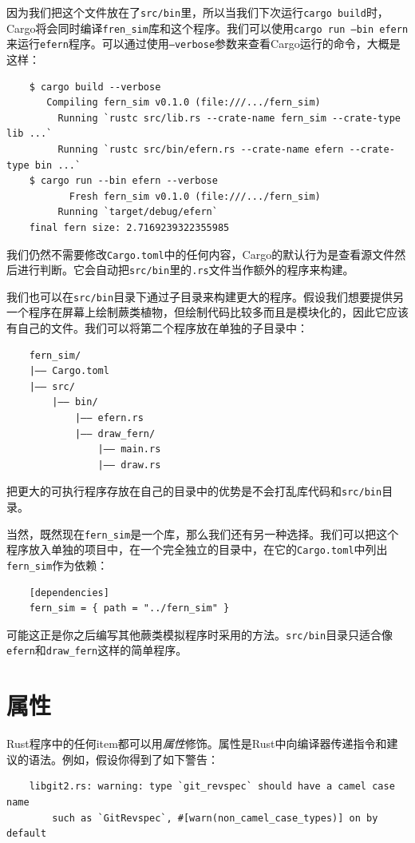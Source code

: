 因为我们把这个文件放在了\texttt{src/bin}里，所以当我们下次运行\texttt{cargo build}时，Cargo将会同时编译\texttt{fren\_sim}库和这个程序。我们可以使用\texttt{cargo run --bin efern}来运行\texttt{efern}程序。可以通过使用\texttt{--verbose}参数来查看Cargo运行的命令，大概是这样：
\begin{verbatim}
    $ cargo build --verbose
       Compiling fern_sim v0.1.0 (file:///.../fern_sim)
         Running `rustc src/lib.rs --crate-name fern_sim --crate-type lib ...`
         Running `rustc src/bin/efern.rs --crate-name efern --crate-type bin ...`
    $ cargo run --bin efern --verbose
           Fresh fern_sim v0.1.0 (file:///.../fern_sim)
         Running `target/debug/efern`
    final fern size: 2.7169239322355985
\end{verbatim}

我们仍然不需要修改\texttt{Cargo.toml}中的任何内容，Cargo的默认行为是查看源文件然后进行判断。它会自动把\texttt{src/bin}里的\texttt{.rs}文件当作额外的程序来构建。

我们也可以在\texttt{src/bin}目录下通过子目录来构建更大的程序。假设我们想要提供另一个程序在屏幕上绘制蕨类植物，但绘制代码比较多而且是模块化的，因此它应该有自己的文件。我们可以将第二个程序放在单独的子目录中：
\begin{verbatim}
    fern_sim/
    |—— Cargo.toml
    |—— src/
        |—— bin/
            |—— efern.rs
            |—— draw_fern/
                |—— main.rs
                |—— draw.rs
\end{verbatim}

把更大的可执行程序存放在自己的目录中的优势是不会打乱库代码和\texttt{src/bin}目录。

当然，既然现在\texttt{fern\_sim}是一个库，那么我们还有另一种选择。我们可以把这个程序放入单独的项目中，在一个完全独立的目录中，在它的\texttt{Cargo.toml}中列出\texttt{fern\_sim}作为依赖：
\begin{verbatim}
    [dependencies]
    fern_sim = { path = "../fern_sim" }
\end{verbatim}

可能这正是你之后编写其他蕨类模拟程序时采用的方法。\texttt{src/bin}目录只适合像\texttt{efern}和\texttt{draw\_fern}这样的简单程序。

\section{属性}

Rust程序中的任何item都可以用\emph{属性}修饰。属性是Rust中向编译器传递指令和建议的语法。例如，假设你得到了如下警告：
\begin{verbatim}
    libgit2.rs: warning: type `git_revspec` should have a camel case name
        such as `GitRevspec`, #[warn(non_camel_case_types)] on by default
\end{verbatim}

